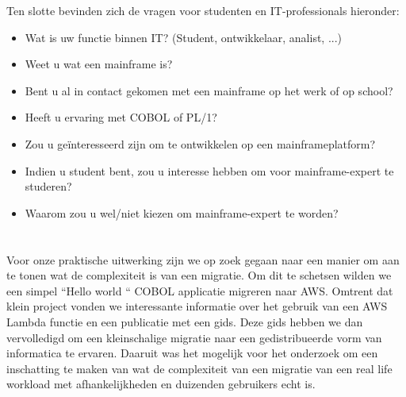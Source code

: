Ten slotte bevinden zich de vragen voor studenten en IT-professionals hieronder:
 \begin{itemize}
    \item Wat is uw functie binnen IT? (Student, ontwikkelaar, analist, ...)
    \item Weet u wat een mainframe is?
    \item Bent u al in contact gekomen met een mainframe op het werk of op school?
    \item Heeft u ervaring met COBOL of PL/1?
    \item Zou u geïnteresseerd zijn om te ontwikkelen op een mainframeplatform?
    \item Indien u student bent, zou u interesse hebben om voor mainframe-expert te studeren?
    \item Waarom zou u wel/niet kiezen om mainframe-expert te worden?
\end{itemize}



\section{}
\label{sec:De praktische uitwerking}

Voor onze praktische uitwerking zijn we op zoek gegaan naar een manier om aan te tonen wat de complexiteit is van een migratie. Om dit te schetsen wilden we een simpel ``Hello world `` COBOL applicatie migreren naar AWS. Omtrent dat klein project vonden we interessante informatie over het gebruik van een AWS Lambda functie en een publicatie met een gids. Deze gids hebben we dan vervolledigd om een kleinschalige migratie naar een gedistribueerde vorm van informatica te ervaren. Daaruit was het mogelijk voor het onderzoek om een inschatting te maken van wat de complexiteit van een migratie van een real life workload met afhankelijkheden en duizenden gebruikers echt is.
